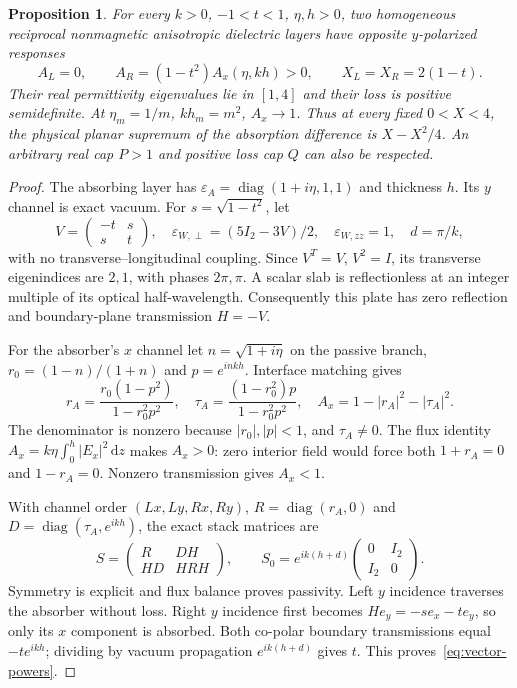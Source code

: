 \documentclass[11pt,a4paper]{article}
\newtheorem{proposition}[theorem]{Proposition}
\theoremstyle{remark}
\newcommand{\abs}[1]{\lvert #1\rvert}
\newcommand{\dd}{\,\mathrm d}
\newcommand{\diag}{\operatorname{diag}}
\begin{document}
\begin{proposition}\label{prop:vector}
For every $k>0$, $-1<t<1$, $\eta,h>0$, two homogeneous reciprocal nonmagnetic anisotropic dielectric layers have opposite $y$-polarized responses
\begin{equation}\label{eq:vector-powers}
 A_L=0,\qquad A_R=(1-t^2)A_x(\eta,kh)>0,\qquad X_L=X_R=2(1-t).
\end{equation}
Their real permittivity eigenvalues lie in $[1,4]$ and their loss is positive semidefinite. At $\eta_m=1/m$, $kh_m=m^2$, $A_x\to1$. Thus at every fixed $0<X<4$, the physical planar supremum of the absorption difference is $X-X^2/4$. An arbitrary real cap $P>1$ and positive loss cap $Q$ can also be respected.
\end{proposition}
\begin{proof}
The absorbing layer has $\varepsilon_A=\diag(1+i\eta,1,1)$ and thickness $h$. Its $y$ channel is exact vacuum. For $s=\sqrt{1-t^2}$, let
\[
 V=\begin{pmatrix}-t&s\\s&t\end{pmatrix},\quad
 \varepsilon_{W,\perp}=(5I_2-3V)/2,\quad\varepsilon_{W,zz}=1,\quad d=\pi/k,
\]
with no transverse--longitudinal coupling. Since $V^T=V$, $V^2=I$, its transverse eigenindices are $2,1$, with phases $2\pi,\pi$. A scalar slab is reflectionless at an integer multiple of its optical half-wavelength. Consequently this plate has zero reflection and boundary-plane transmission $H=-V$.

For the absorber's $x$ channel let $n=\sqrt{1+i\eta}$ on the passive branch, $r_0=(1-n)/(1+n)$ and $p=e^{inkh}$. Interface matching gives
\[
 r_A=\frac{r_0(1-p^2)}{1-r_0^2p^2},\quad
 \tau_A=\frac{(1-r_0^2)p}{1-r_0^2p^2},\quad
 A_x=1-\abs{r_A}^2-\abs{\tau_A}^2.
\]
The denominator is nonzero because $\abs{r_0},\abs p<1$, and $\tau_A\ne0$. The flux identity $A_x=k\eta\int_0^h\abs{E_x}^2\dd z$ makes $A_x>0$: zero interior field would force both $1+r_A=0$ and $1-r_A=0$. Nonzero transmission gives $A_x<1$.

With channel order $(Lx,Ly,Rx,Ry)$, $R=\diag(r_A,0)$ and $D=\diag(\tau_A,e^{ikh})$, the exact stack matrices are
\[
 S=\begin{pmatrix}R&DH\\HD&HRH\end{pmatrix},\qquad
 S_0=e^{ik(h+d)}\begin{pmatrix}0&I_2\\I_2&0\end{pmatrix}.
\]
Symmetry is explicit and flux balance proves passivity. Left $y$ incidence traverses the absorber without loss. Right $y$ incidence first becomes $He_y=-se_x-te_y$, so only its $x$ component is absorbed. Both co-polar boundary transmissions equal $-te^{ikh}$; dividing by vacuum propagation $e^{ik(h+d)}$ gives $t$. This proves~\eqref{eq:vector-powers}.


\end{proof}
\end{document}
